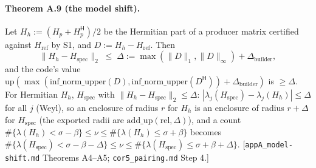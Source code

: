 \paragraph{Theorem A.9 (the model shift).}
Let $H_h := (H_p+H_p^{\mathsf H})/2$ be the Hermitian part of a producer matrix certified against $H_{\mathrm{ref}}$ by S1, and
$D := H_h - H_{\mathrm{ref}}$. Then
\[
\|H_h - H_{\mathrm{spec}}\|_2 \;\le\; \Delta := \max(\|D\|_1,\|D\|_\infty) + \Delta_{\mathrm{builder}},
\]
and the code's value $\mathrm{up}(\max(\mathrm{inf\_norm\_upper}(D),\mathrm{inf\_norm\_upper}(D^{\mathsf H}))+\Delta_{\mathrm{builder}})$ is $\ge\Delta$.
For Hermitian $H_h$, $H_{\mathrm{spec}}$ with $\|H_h-H_{\mathrm{spec}}\|_2\le\Delta$: $|\lambda_j(H_{\mathrm{spec}})-\lambda_j(H_h)|\le\Delta$ for all $j$
(Weyl), so an enclosure of radius $r$ for $H_h$ is an enclosure of radius $r+\Delta$ for $H_{\mathrm{spec}}$ (the exported radii
are $\mathrm{add\_up}(\mathrm{rel},\Delta)$), and a count $\#\{\lambda(H_h)<\sigma-\beta\}\le\nu\le\#\{\lambda(H_h)\le\sigma+\beta\}$ becomes
$\#\{\lambda(H_{\mathrm{spec}})<\sigma-\beta-\Delta\}\le\nu\le\#\{\lambda(H_{\mathrm{spec}})\le\sigma+\beta+\Delta\}$.
[\texttt{appA\_model-shift.md} Theorems A4--A5; \texttt{cor5\_pairing.md} Step 4.]

